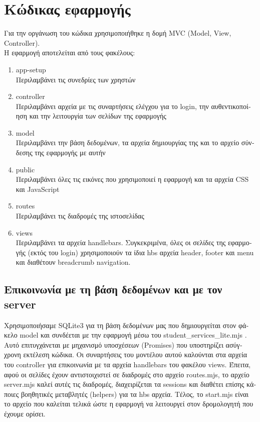 \documentclass[manuscript,screen,review]{acmart}
\newcommand{\gr}[1]{\foreignlanguage{greek}{#1}}
\begin{document}
\section{\gr{Κώδικας εφαρμογής}}
\gr{Για την οργάνωση του κώδικα χρησιμοποιήθηκε η δομή} MVC (Model, View, Controller).
\\\gr{Η εφαρμογή αποτελείται από τους φακέλους:}
\begin{enumerate}
    \item app-setup \\\gr{Περιλαμβάνει τις συνεδρίες των χρηστών}
    \item controller \\\gr{Περιλαμβάνει αρχεία με τις συναρτήσεις ελέγχου για το} login, \gr{την αυθεντικοποίηση και την λειτουργία των σελίδων της εφαρμογής}
    \item model \\\gr{Περιλαμβάνει την βάση δεδομένων, τα αρχεία δημιουργίας της και το αρχείο σύνδεσης της εφαρμογής με αυτήν}
    \item public \\\gr{Περιλαμβάνει όλες τις εικόνες που χρησιμοποιεί η εφαρμογή και τα αρχεία} CSS \gr{και} JavaScript
    \item routes \\\gr{Περιλαμβάνει τις διαδρομές της ιστοσελίδας}
    \item views \\\gr{Περιλαμβάνει τα αρχεία} handlebars. \gr{Συγκεκριμένα, όλες οι σελίδες της εφαρμογής (εκτός του} login) \gr{χρησιμοποιούν τα ίδια} hbs \gr{αρχεία} header, footer \gr{και} menu \gr{και διαθέτουν} breadcrumb navigation.
\end{enumerate}

\subsection{\gr{Επικοινωνία με τη βάση δεδομένων και με τον server}}
\gr{Χρησιμοποιήσαμε} SQLite3 \gr{για τη βάση δεδομένων μας που δημιουργείται στον φάκελο} model \gr{και συνδέεται με την εφαρμογή μέσω του} student\_services\_lite.mjs . \gr{Αυτό επιτυγχάνεται με μηχανισμό υποσχέσεων} (Promises) \gr{που υποστηρίζει ασύγχρονη εκτέλεση κώδικα. Οι συναρτήσεις του μοντέλου αυτού καλούνται στα αρχεία του} controller \gr{για επικοινωνία με τα αρχεία} handlebars \gr{του φακέλου} views. \gr{Έπειτα, αφού οι σελίδες έχουν αντιστοιχιστεί σε διαδρομές στο αρχείο} routes.mjs, \gr{το αρχείο} server.mjs \gr{καλεί αυτές τις διαδρομές, διαχειρίζεται τα} sessions \gr{και διαθέτει επίσης κάποιες βοηθητικές μεταβλητές} (helpers) \gr{για τα} hbs \gr{αρχεία. Τέλος, το} start.mjs \gr{είναι το αρχείο που καλείται τελικά ώστε η εφαρμογή να λειτουργεί στον δρομολογητή που έχουμε ορίσει.}
\end{document}
